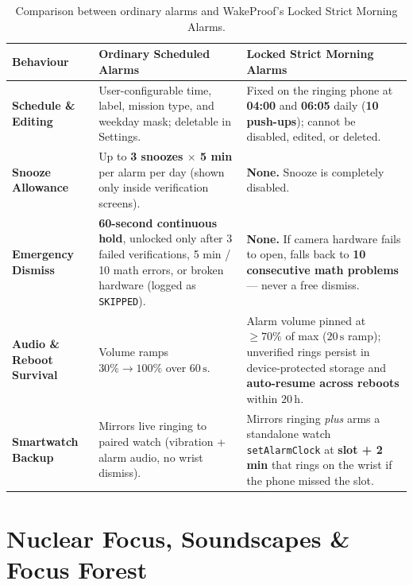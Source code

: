 \documentclass[11pt,a4paper]{article}
\begin{document}
\begin{table}[ht!]
\centering
\small
\begin{tabularx}{\textwidth}{@{}L{3.5cm}Y Y@{}}
\toprule
\textbf{\sffamily Behaviour} & \textbf{\sffamily Ordinary Scheduled Alarms} & \textbf{\sffamily Locked Strict Morning Alarms} \\
\midrule
\textbf{Schedule \& Editing} & User-configurable time, label, mission type, and weekday mask; deletable in Settings. & Fixed on the ringing phone at \textbf{04:00} and \textbf{06:05} daily (\textbf{10 push-ups}); cannot be disabled, edited, or deleted. \\
\addlinespace[3pt]
\textbf{Snooze Allowance} & Up to \textbf{3 snoozes $\times$ 5 min} per alarm per day (shown only inside verification screens). & \textbf{None.} Snooze is completely disabled. \\
\addlinespace[3pt]
\textbf{Emergency Dismiss} & \textbf{60-second continuous hold}, unlocked only after 3 failed verifications, 5 min / 10 math errors, or broken hardware (logged as \texttt{SKIPPED}). & \textbf{None.} If camera hardware fails to open, falls back to \textbf{10 consecutive math problems} --- never a free dismiss. \\
\addlinespace[3pt]
\textbf{Audio \& Reboot Survival} & Volume ramps $30\% \rightarrow 100\%$ over $60\,\text{s}$. & Alarm volume pinned at $\ge 70\%$ of max ($20\,\text{s}$ ramp); unverified rings persist in device-protected storage and \textbf{auto-resume across reboots} within $20\,\text{h}$. \\
\addlinespace[3pt]
\textbf{Smartwatch Backup} & Mirrors live ringing to paired watch (vibration + alarm audio, no wrist dismiss). & Mirrors ringing \emph{plus} arms a standalone watch \texttt{setAlarmClock} at \textbf{slot + 2 min} that rings on the wrist if the phone missed the slot. \\
\bottomrule
\end{tabularx}
\caption{Comparison between ordinary alarms and WakeProof's Locked Strict Morning Alarms.}
\end{table}

\section{Nuclear Focus, Soundscapes \& Focus Forest}
\end{document}
